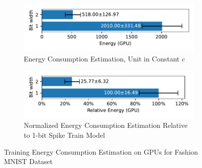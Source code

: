         \begin{figure}[H]
            \centering
            \begin{subfigure}[H]{\textwidth}
                \includegraphics[width=\textwidth]{../timesteps/FashionMNIST/plots/fashionmnist_train_energy_gpu_horizontal.pdf}
                \caption{Energy Consumption Estimation, Unit in Constant $c$}
            \end{subfigure}
            \hfill
            \begin{subfigure}[H]{\textwidth}
                \includegraphics[width=\textwidth]{../timesteps/FashionMNIST/plots/fashionmnist_train_relative_energy_gpu_horizontal.pdf}
                \caption{Normalized Energy Consumption Estimation Relative to 1-bit Spike Train Model}
            \end{subfigure}
            \caption{Training Energy Consumption Estimation on GPUs for Fashion MNIST Dataset}
        \end{figure}

